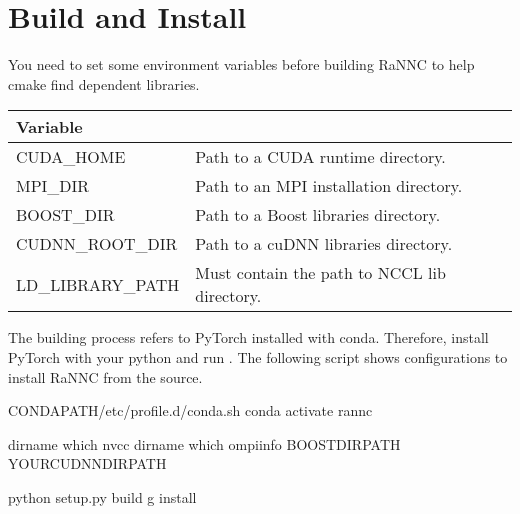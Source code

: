 \documentclass[letterpaper,10pt,english]{sphinxmanual}
\begin{document}
\section{Build and Install}
\label{\detokenize{build:build-and-install}}
You need to set some environment variables before building RaNNC to help cmake find dependent libraries.


\begin{savenotes}\sphinxattablestart
\centering
{}
\sphinxthecaptionisattop
{}\label{\detokenize{build:id1}}
\sphinxaftertopcaption
\begin{tabulary}{\linewidth}[t]{|T|T|}
\hline

Variable
&\\
\hline
CUDA\_HOME
&
Path to a CUDA runtime directory.
\\
\hline
MPI\_DIR
&
Path to an MPI installation directory.
\\
\hline
BOOST\_DIR
&
Path to a Boost libraries directory.
\\
\hline
CUDNN\_ROOT\_DIR
&
Path to a cuDNN libraries directory.
\\
\hline
LD\_LIBRARY\_PATH
&
Must contain the path to NCCL lib directory.
\\
\hline
\end{tabulary}
\par
\sphinxattableend\end{savenotes}

The building process refers to PyTorch installed with conda.
Therefore, install PyTorch with your python and run .
The following script shows configurations to install RaNNC from the source.

\begin{sphinxVerbatim}[commandchars=\\\{\}]

  \PYG{o}{[}CONDA\PYGZus{}PATH\PYG{o}{]}/etc/profile.d/conda.sh
 conda activate rannc

  dirname which nvcc
  dirname which ompi\PYGZus{}info
  \PYG{o}{[}BOOST\PYGZus{}DIR\PYGZus{}PATH\PYG{o}{]}
  \PYG{o}{[}YOUR\PYGZus{}CUDNN\PYGZus{}DIR\PYGZus{}PATH\PYG{o}{]}

 python setup.py build \PYGZhy{}g install
\end{sphinxVerbatim}
\end{document}
